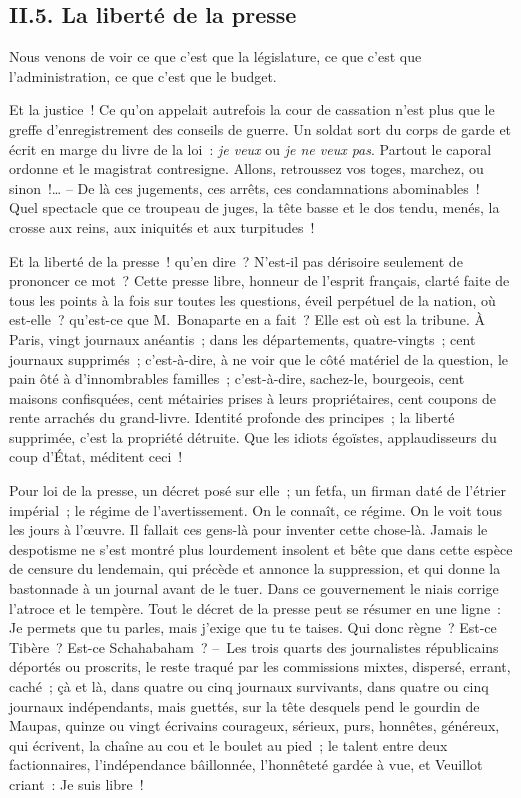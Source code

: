 \documentclass[french,twoside]{book} %
\begin{document}
\subsection[{II.5. La liberté de la presse}]{II.5. La liberté de la presse}
\noindent Nous venons de voir ce que c’est que la législature, ce que c’est que l’administration, ce que c’est que le budget.\par
Et la justice ! Ce qu’on appelait autrefois la cour de cassation n’est plus que le greffe d’enregistrement des conseils de guerre. Un soldat sort du corps de garde et écrit en marge du livre de la loi : \emph{je veux} ou \emph{je ne veux pas}. Partout le caporal ordonne et le magistrat contresigne. Allons, retroussez vos toges, marchez, ou sinon !… – De là ces jugements, ces arrêts, ces condamnations abominables ! Quel spectacle que ce troupeau de juges, la tête basse et le dos tendu, menés, la crosse aux reins, aux iniquités et aux turpitudes !\par
Et la liberté de la presse ! qu’en dire ? N’est-il pas dérisoire seulement de prononcer ce mot ? Cette presse libre, honneur de l’esprit français, clarté faite de tous les points à la fois sur toutes les questions, éveil perpétuel de la nation, où est-elle ? qu’est-ce que M. Bonaparte en a fait ? Elle est où est la tribune. À Paris, vingt journaux anéantis ; dans les départements, quatre-vingts ; cent journaux supprimés ; c’est-à-dire, à ne voir que le côté matériel de la question, le pain ôté à d’innombrables familles ; c’est-à-dire, sachez-le, bourgeois, cent maisons confisquées, cent métairies prises à leurs propriétaires, cent coupons de rente arrachés du grand-livre. Identité profonde des principes ; la liberté supprimée, c’est la propriété détruite. Que les idiots égoïstes, applaudisseurs du coup d’État, méditent ceci !\par
Pour loi de la presse, un décret posé sur elle ; un fetfa, un firman daté de l’étrier impérial ; le régime de l’avertissement. On le connaît, ce régime. On le voit tous les jours à l’œuvre. Il fallait ces gens-là pour inventer cette chose-là. Jamais le despotisme ne s’est montré plus lourdement insolent et bête que dans cette espèce de censure du lendemain, qui précède et annonce la suppression, et qui donne la bastonnade à un journal avant de le tuer. Dans ce gouvernement le niais corrige l’atroce et le tempère. Tout le décret de la presse peut se résumer en une ligne : Je permets que tu parles, mais j’exige que tu te taises. Qui donc règne ? Est-ce Tibère ? Est-ce Schahabaham ? – Les trois quarts des journalistes républicains déportés ou proscrits, le reste traqué par les commissions mixtes, dispersé, errant, caché ; çà et là, dans quatre ou cinq journaux survivants, dans quatre ou cinq journaux indépendants, mais guettés, sur la tête desquels pend le gourdin de Maupas, quinze ou vingt écrivains courageux, sérieux, purs, honnêtes, généreux, qui écrivent, la chaîne au cou et le boulet au pied ; le talent entre deux factionnaires, l’indépendance bâillonnée, l’honnêteté gardée à vue, et Veuillot criant : Je suis libre !
\end{document}
